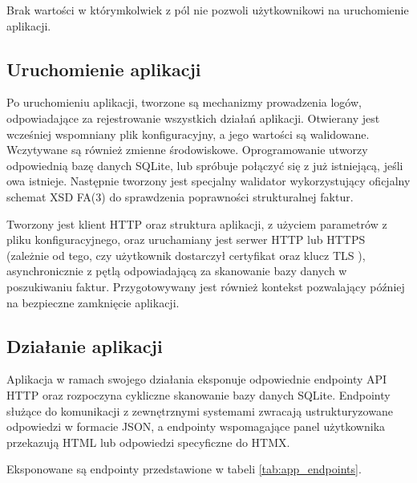 Brak wartości w którymkolwiek z pól nie pozwoli użytkownikowi na uruchomienie aplikacji.

\subsection{Uruchomienie aplikacji}
Po uruchomieniu aplikacji, tworzone są mechanizmy prowadzenia logów, odpowiadające za rejestrowanie wszystkich działań aplikacji. Otwierany jest wcześniej wspomniany plik konfiguracyjny, a jego wartości są walidowane. Wczytywane są również zmienne środowiskowe. Oprogramowanie utworzy odpowiednią bazę danych SQLite, lub spróbuje połączyć się z już istniejącą, jeśli owa istnieje. Następnie tworzony jest specjalny walidator wykorzystujący oficjalny schemat XSD FA(3) do sprawdzenia poprawności strukturalnej faktur. 

Tworzony jest klient HTTP oraz struktura aplikacji, z użyciem parametrów z pliku konfiguracyjnego, oraz uruchamiany jest serwer HTTP lub HTTPS (zależnie od tego, czy użytkownik dostarczył certyfikat oraz klucz TLS \parencite{rfc8446}), asynchronicznie z pętlą odpowiadającą za skanowanie bazy danych w poszukiwaniu faktur. Przygotowywany jest również kontekst pozwalający później na bezpieczne zamknięcie aplikacji. 

\subsection{Działanie aplikacji}
Aplikacja w ramach swojego działania eksponuje odpowiednie endpointy API HTTP oraz rozpoczyna cykliczne skanowanie bazy danych SQLite. Endpointy służące do komunikacji z zewnętrznymi systemami zwracają ustrukturyzowane odpowiedzi w formacie JSON, a endpointy wspomagające panel użytkownika przekazują HTML lub odpowiedzi specyficzne do HTMX.

\noindent Eksponowane są endpointy przedstawione w tabeli \ref{tab:app_endpoints}.

